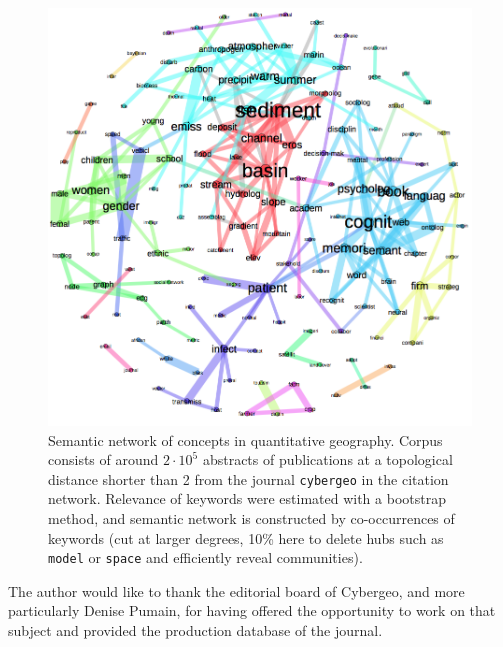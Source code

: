 \begin{figure}
\hspace{-2cm}
\includegraphics[width=1.4\textwidth]{figures/all_lesslinks}
\caption[Semantic network of concepts in quantitative geography]{Semantic network of concepts in quantitative geography. Corpus consists of around $2\cdot 10^5$ abstracts of publications at a topological distance shorter than 2 from the journal \texttt{cybergeo} in the citation network. Relevance of keywords were estimated with a bootstrap method, and semantic network is constructed by co-occurrences of keywords (cut at larger degrees, 10\% here to delete hubs such as \texttt{model} or \texttt{space} and efficiently reveal communities).}
\label{fig:quantepistemo:semanticnw}
\end{figure}














\begin{acknowledgements}
The author would like to thank the editorial board of Cybergeo, and more particularly Denise Pumain, for having offered the opportunity to work on that subject and provided the production database of the journal. 
\end{acknowledgements}





